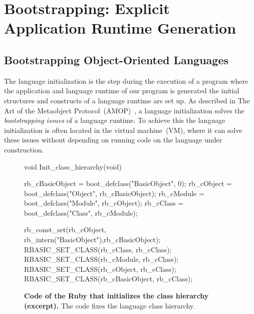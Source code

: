 
\part{Bootstrapping: Explicit Application Runtime Generation}
\chapter{Bootstrapping Object-Oriented Languages}
\minitoc
\introduction

The language initialization is the step during the execution of a program where the application and language runtime of our program is generated \ie the initial structures and constructs of a language runtime are set up.
As described in The Art of the Metaobject Protocol~(AMOP)~\cite{Kicz91a}, a language initialization solves the \emph{bootstrapping issues} of a language runtime. To achieve this the language initialization is often located in the virtual machine~(VM), where it can solve these issues without depending on running code on the language under construction.

\begin{figure}[ht!]
\begin{code}
void Init_class_hierarchy(void) {
    rb_cBasicObject = boot_defclass("BasicObject", 0);
    rb_cObject = boot_defclass("Object", rb_cBasicObject);
    rb_cModule = boot_defclass("Module", rb_cObject);
    rb_cClass =  boot_defclass("Class",  rb_cModule);

    rb_const_set(rb_cObject, rb_intern("BasicObject"),rb_cBasicObject);
    RBASIC_SET_CLASS(rb_cClass, rb_cClass);
    RBASIC_SET_CLASS(rb_cModule, rb_cClass);
    RBASIC_SET_CLASS(rb_cObject, rb_cClass);
    RBASIC_SET_CLASS(rb_cBasicObject, rb_cClass);
}
\end{code}
\caption{\textbf{Code of the Ruby \VM that initializes the class hierarchy (excerpt).} The \VM code fixes the language class hierarchy.\label{code:ruby_hierarchy}}
\end{figure}

